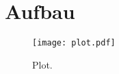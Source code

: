 \section{Aufbau}
\label{sec:Aufbau}

\begin{figure}
  \centering
  \texttt{[image: plot.pdf]}
  \caption{Plot.}
  \label{fig:plot}
\end{figure}
